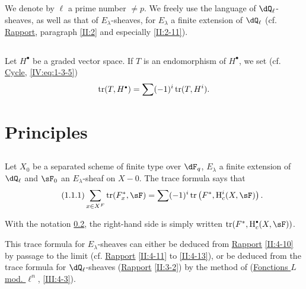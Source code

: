 \subsection{}\label{VI:0-2}

We denote by $\ell$ a prime number $\ne p$. We freely use the
language of $\dQ_\ell$-sheaves, as well as that of $E_\lambda$-sheaves,
for $E_\lambda$ a finite extension of $\dQ_\ell$ (cf. \hyperref[II]{Rapport},
paragraph \ref{II:2} and especially \ref{II:2-11}). 





\subsection{}\label{VI:0-3}

Let $H^\bullet$ be a graded vector space. If $T$ is an endomorphism of
$H^\bullet$, we set (cf. \hyperref[IV]{Cycle}, \ref{IV:eq:1-3-5}) 
\[
  \tr(T,H^\bullet) = \sum (-1)^i \tr(T,H^i) \text{.}
\]










\section{Principles}\label{VI:1}





\subsection{}\label{VI:1-1}

Let $X_0$ be a separated scheme of finite type over $\dF_q$, $E_\lambda$ a
finite extension of $\dQ_\ell$ and $\sF_0$ an $E_\lambda$-sheaf on $X-0$. The
trace formula says that 
\begin{equation*}\tag{1.1.1}\label{VI:eq:1-1-1}
  \sum_{x\in X^F} \tr(F_x^\ast,\sF) = \sum (-1)^i \tr\left(F^\ast,\h_c^i(X,\sF)\right) \text{.}
\end{equation*}

With the notation \ref{VI:0-3}, the right-hand side is simply written
$\tr(F^\ast,\h_c^\bullet(X,\sF))$.

This trace formula for $E_\lambda$-sheaves can either be
deduced from \hyperref[II]{Rapport} \ref{II:4-10} by passage to the limit (cf.
\hyperref[II]{Rapport} \ref{II:4-11} to \ref{II:4-13}), or be deduced
from the trace formula for $\dQ_\ell$-sheaves (\hyperref[II]{Rapport}
\ref{II:3-2}) by the method of (\hyperref[III]{Fonctions $L$ mod. $\ell^n$},
\ref{III:4-3}).

